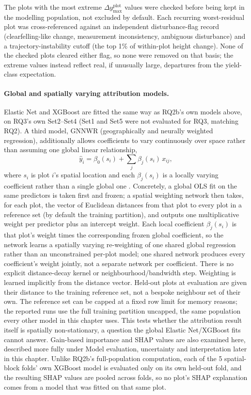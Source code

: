 \documentclass[11pt,a4paper]{report}
\begin{document}
The plots with the most extreme $\Delta y_{\max}^{\text{plot}}$ values were checked before being
kept in the modelling population, not excluded by default. Each recurring worst-residual plot was
cross-referenced against an independent disturbance-flag record (clearfelling-like change,
measurement inconsistency, ambiguous disturbance) and a trajectory-instability cutoff (the top 1\%
of within-plot height change). None of the checked plots cleared either flag, so none were removed
on that basis; the extreme values instead reflect real, if unusually large, departures from the
yield-class expectation.

\paragraph*{Global and spatially varying attribution models.}
Elastic Net and XGBoost are fitted the same way as RQ2b's own models above, on RQ3's own
Set2--Set4 (Set1 and Set5 were not evaluated for RQ3, matching RQ2). A third
model, GNNWR (geographically and neurally weighted regression), additionally allows coefficients
to vary continuously over space rather than assuming one global linear relationship,
\begin{equation}
\hat y_i = \beta_0(s_i) + \sum_j \beta_j(s_i)\,x_{ij},
\label{eq:gnnwr}
\end{equation}
where $s_i$ is plot $i$'s spatial location and each $\beta_j(s_i)$ is a locally varying
coefficient rather than a single global one \citep{du2020}. %
Concretely, a global OLS fit on the same predictors is taken first and frozen; a spatial weighting
network then takes, for each plot, the vector of Euclidean distances from that plot to every plot
in a reference set (by default the training partition), and outputs one multiplicative weight per
predictor plus an intercept weight. Each local coefficient $\beta_j(s_i)$ is that plot's weight
times the corresponding frozen global coefficient, so the network learns a spatially varying
re-weighting of one shared global regression rather than an unconstrained per-plot model; one
shared network produces every coefficient's weight jointly, not a separate network per coefficient.
There is no explicit distance-decay kernel or neighbourhood/bandwidth step. Weighting is learned
implicitly from the distance vector. Held-out plots at evaluation are given their distance to
the training reference set, not a bespoke neighbour set of their own. The reference set can be
capped at a fixed row limit for memory reasons; the reported runs use the full training partition
uncapped, the same population every other model in this chapter uses. This tests whether the
attribution result itself is spatially non-stationary, a question the global Elastic Net/XGBoost
fits cannot answer. Gain-based importance and SHAP values are also examined here, described more
fully under Model evaluation, uncertainty and interpretation later in this chapter. Unlike RQ2b's
full-population computation, each of the 5 spatial-block folds' own XGBoost model is evaluated
only on its own held-out fold, and the resulting SHAP values are pooled across folds, so no plot's
SHAP explanation comes from a model that was fitted on that same plot.
\end{document}
